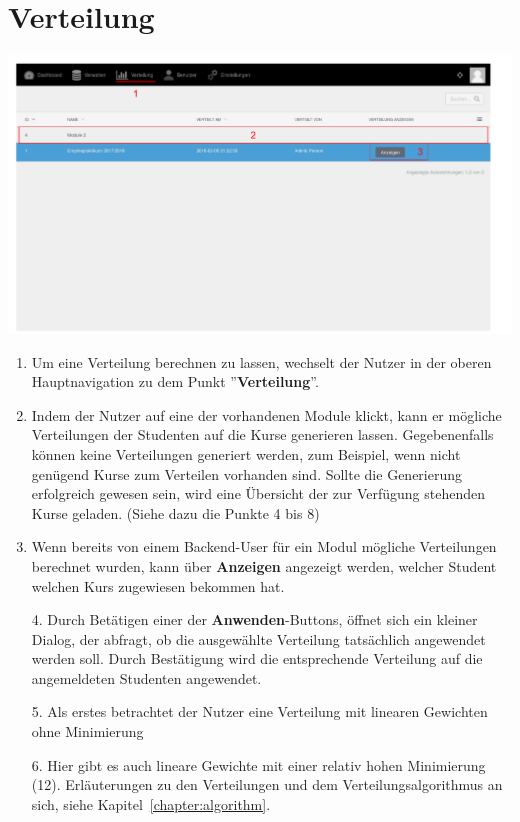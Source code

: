   
  \section{Verteilung}
  \label{section:distribution}
  
  \includegraphics[scale=0.3]{backend/img/distribution_1.pdf}
  
  \begin{enumerate}
   \item Um eine Verteilung berechnen zu lassen, wechselt der Nutzer in der oberen Hauptnavigation zu dem Punkt ''\textbf{Verteilung}''.
   \item Indem der Nutzer auf eine der vorhandenen Module klickt, kann er mögliche Verteilungen der Studenten auf die Kurse generieren lassen.
	 Gegebenenfalls können keine Verteilungen generiert werden, zum Beispiel, wenn nicht genügend Kurse zum Verteilen vorhanden sind.
	 Sollte die Generierung erfolgreich gewesen sein, wird eine Übersicht der zur Verfügung stehenden Kurse geladen. 
	 (Siehe dazu die Punkte 4 bis 8)
   \item Wenn bereits von einem Backend-User für ein Modul mögliche Verteilungen berechnet wurden, kann über \textbf{Anzeigen} angezeigt werden, welcher Student welchen Kurs zugewiesen bekommen hat.
  \end{enumerate}
  
  
  \begin{enumerate}
   \item[4.] Durch Betätigen einer der \textbf{Anwenden}-Buttons, öffnet sich ein kleiner Dialog, der abfragt, ob die ausgewählte Verteilung 
	    tatsächlich angewendet werden soll. Durch Bestätigung wird die entsprechende Verteilung auf die angemeldeten Studenten angewendet.  
   \item[5.] Als erstes betrachtet der Nutzer eine Verteilung mit linearen Gewichten ohne Minimierung
   \item[6.] Hier gibt es auch lineare Gewichte mit einer relativ hohen Minimierung (12). 
	     Erläuterungen zu den Verteilungen und dem Verteilungsalgorithmus an sich, siehe Kapitel~\ref{chapter:algorithm}. 
  \end{enumerate}

